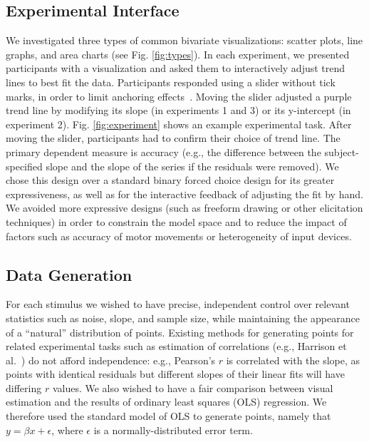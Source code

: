 \documentclass{sigchi}
\begin{document}
\subsection{Experimental Interface}
\typesFig

We investigated three types of common bivariate visualizations: scatter plots, line graphs, and area charts (see Fig. \ref{fig:types}). In each experiment, we presented participants with a visualization and asked them to interactively adjust trend lines to best fit the data.  Participants responded using a slider without tick marks, in order to limit anchoring effects~\cite{matejka2016effect}. Moving the slider adjusted a purple trend line by modifying its slope (in experiments 1 and 3) or its y-intercept (in experiment 2). Fig. \ref{fig:experiment} shows an example experimental task. After moving the slider, participants had to confirm their choice of trend line. The primary dependent measure is accuracy (e.g., the difference between the subject-specified slope and the slope of the series if the residuals were removed). We chose this design over a standard binary forced choice design for its greater expressiveness, as well as for the interactive feedback of adjusting the fit by hand. We avoided more expressive designs (such as freeform drawing or other elicitation techniques) in order to constrain the model space and to reduce the impact of factors such as accuracy of motor movements or heterogeneity of input devices. 

\subsection{Data Generation}

\sigmasFig

\trendtypesFig

For each stimulus we wished to have precise, independent control over relevant statistics such as noise, slope, and sample size, while maintaining the appearance of a ``natural'' distribution of points. Existing methods for generating points for related experimental tasks such as estimation of correlations (e.g., Harrison et al.~\cite{harrison2014ranking}) do not afford independence: e.g., Pearson's $r$ is correlated with the slope, as points with identical residuals but different slopes of their linear fits will have differing $r$ values. We also wished to have a fair comparison between visual estimation and the results of ordinary least squares (OLS) regression. We therefore used the standard model of OLS to generate points, namely that $y=\beta x + \epsilon$, where $\epsilon$ is a normally-distributed error term.
\end{document}
